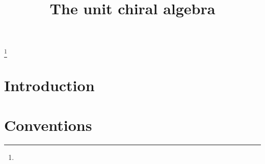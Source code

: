 \documentclass[11pt]{amsart}
\theoremstyle{definition}
\theoremstyle{remark}
\numberwithin{equation}{section}
\begin{document}
\title[]{The unit chiral algebra}%
\author{}%
\address{}%
\email{}%

\thanks{}%
\subjclass{}%
\keywords{}%

\begin{abstract}

\end{abstract}
\maketitle
\tableofcontents



\section{Introduction}
\section{Conventions}
\end{document}
